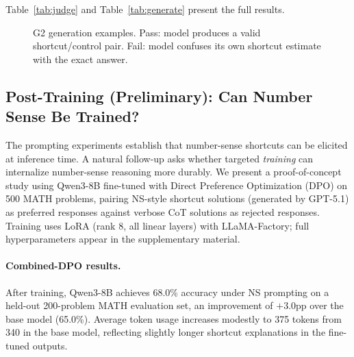 Table~\ref{tab:judge} and Table~\ref{tab:generate} present the full results.




\begin{figure}[t]
\centering
\small
{}
\caption{G2 generation examples. Pass: model produces a valid shortcut/control pair. Fail: model confuses its own shortcut estimate with the exact answer.}
\label{fig:g2_case}
\end{figure}

\subsection{Post-Training (Preliminary): Can Number Sense Be Trained?}
\label{sec:training}

The prompting experiments establish that number-sense shortcuts can be elicited at inference time.
A natural follow-up asks whether targeted \emph{training} can internalize number-sense reasoning more durably.
We present a proof-of-concept study using Qwen3-8B fine-tuned with Direct Preference Optimization (DPO) on 500 MATH problems, pairing NS-style shortcut solutions (generated by GPT-5.1) as preferred responses against verbose CoT solutions as rejected responses.
Training uses LoRA (rank 8, all linear layers) with LLaMA-Factory; full hyperparameters appear in the supplementary material.

\paragraph{Combined-DPO results.}
After training, Qwen3-8B achieves 68.0\% accuracy under NS prompting on a held-out 200-problem MATH evaluation set, an improvement of ${+}3.0$pp over the base model (65.0\%).
Average token usage increases modestly to 375 tokens from 340 in the base model, reflecting slightly longer shortcut explanations in the fine-tuned outputs.


